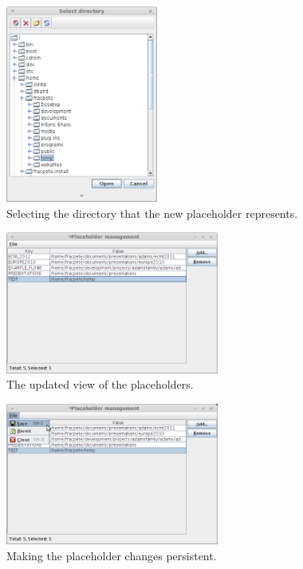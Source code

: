 \begin{figure}[htb]
  \centering
  \includegraphics[width=5.0cm]{images/placeholdermanagement-add2.png}
  \caption{Selecting the directory that the new placeholder represents.}
  \label{placeholdermanagement-add2}
\end{figure}

\begin{figure}[htb]
  \centering
  \includegraphics[width=7.0cm]{images/placeholdermanagement-add3.png}
  \caption{The updated view of the placeholders.}
  \label{placeholdermanagement-add3}
\end{figure}

\begin{figure}[htb]
  \centering
  \includegraphics[width=7.0cm]{images/placeholdermanagement-save.png}
  \caption{Making the placeholder changes persistent.}
  \label{placeholdermanagement-save}
\end{figure}

